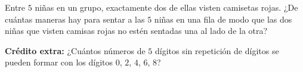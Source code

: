 \documentclass[12pt]{article}
\begin{document}
\begin{problema}
Entre $5$ niñas en un grupo, exactamente dos de ellas visten camisetas rojas. ¿De cuántas maneras hay para sentar a las $5$ niñas en una fila de modo que las dos niñas que visten camisas rojas no estén sentadas una al lado de la otra?
\end{problema}
\textbf{Crédito extra:} ¿Cuántos números de $5$ dígitos sin repetición de dígitos se pueden formar con los dígitos $0$, $2$, $4$, $6$, $8$?
\end{document}
